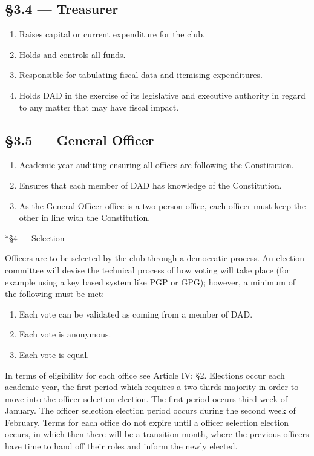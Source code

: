 \documentclass[11pt]{report}
\makeatletter
\renewcommand{\section}{\@startsection{subsection}{2}{0mm}{-\baselineskip}{0.5\baselineskip}{\normalfont\large\bf}}
\makeatother
\begin{document}
	\subsection*{\S3.4 --- Treasurer}
	\begin{enumerate}
		\item Raises capital or current expenditure for the club.
		\item Holds and controls all funds.
		\item Responsible for tabulating fiscal data and itemising expenditures.
		\item Holds DAD in the exercise of its legislative and executive authority in regard to any matter that may have fiscal impact.
	\end{enumerate}
	
	\subsection*{\S3.5 --- General Officer}
	\begin{enumerate}
		\item Academic year auditing ensuring all offices are following the Constitution.
		\item Ensures that each member of DAD has knowledge of the Constitution.
		\item As the General Officer office is a two person office, each officer must keep the other in line with the Constitution.
	\end{enumerate}
	
	\section*{\S4 --- Selection}
	
	Officers are to be selected by the club through a democratic process. An election committee will devise the technical process of how voting will take place (for example using a key based system like PGP or GPG); however, a minimum of the following must be met:
	
	\begin{enumerate}
		\item Each vote can be validated as coming from a member of DAD.
		\item Each vote is anonymous.
		\item Each vote is equal.
	\end{enumerate}
	
	In terms of eligibility for each office see Article IV: \S2. Elections occur each academic year, the first period which requires a two-thirds majority in order to move into the officer selection election. The first period occurs third week of January. The officer selection election period occurs during the second week of February. Terms for each office do not expire until a officer selection election occurs, in which then there will be a transition month, where the previous officers have time to hand off their roles and inform the newly elected.
	
\end{document}
